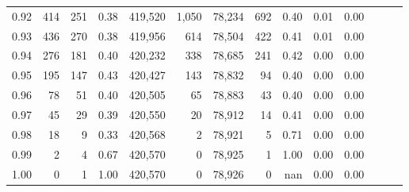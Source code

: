 \begin{tabular}{rrrrrrrrrrrrrr}
0.92 &    414 &    251 &  0.38 &  419,520 &    1,050 &  78,234 &     692 &  0.40 &  0.01 &      0.00 \\
0.93 &    436 &    270 &  0.38 &  419,956 &      614 &  78,504 &     422 &  0.41 &  0.01 &      0.00 \\
0.94 &    276 &    181 &  0.40 &  420,232 &      338 &  78,685 &     241 &  0.42 &  0.00 &      0.00 \\
0.95 &    195 &    147 &  0.43 &  420,427 &      143 &  78,832 &      94 &  0.40 &  0.00 &      0.00 \\
0.96 &     78 &     51 &  0.40 &  420,505 &       65 &  78,883 &      43 &  0.40 &  0.00 &      0.00 \\
0.97 &     45 &     29 &  0.39 &  420,550 &       20 &  78,912 &      14 &  0.41 &  0.00 &      0.00 \\
0.98 &     18 &      9 &  0.33 &  420,568 &        2 &  78,921 &       5 &  0.71 &  0.00 &      0.00 \\
0.99 &      2 &      4 &  0.67 &  420,570 &        0 &  78,925 &       1 &  1.00 &  0.00 &      0.00 \\
1.00 &      0 &      1 &  1.00 &  420,570 &        0 &  78,926 &       0 &   nan &  0.00 &      0.00 \\
\bottomrule
\end{tabular}
